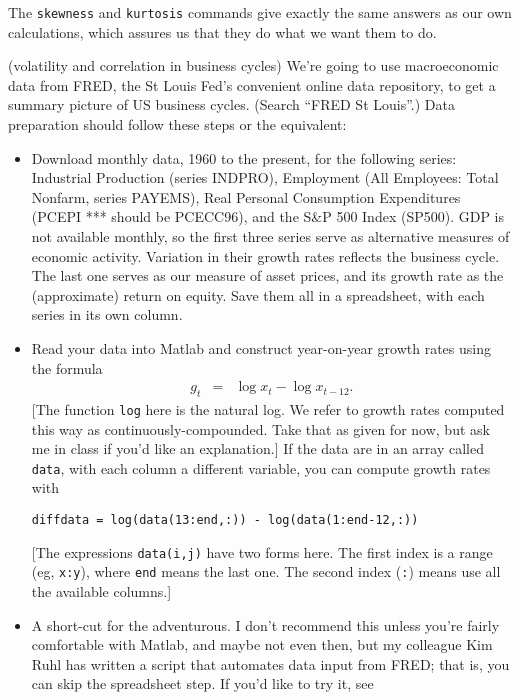 \documentclass[11pt]{exam}
\begin{document}
\begin{questions}
\begin{solution}
\begin{parts}
\item The {\tt skewness} and {\tt kurtosis} commands
give exactly the same answers as our own calculations,
which assures us that they do what we want them to do.
\end{parts}
\end{solution}

\question (volatility and correlation in business cycles)
We're going to use macroeconomic data from FRED,
the St Louis Fed's convenient online data repository,
to get a summary picture of US business cycles.
(Search ``FRED St Louis''.)
%
Data preparation should follow these steps or the equivalent:
\begin{itemize}
\item Download monthly data, 1960 to the present,
for the following series:
Industrial Production (series INDPRO),
Employment (All Employees: Total Nonfarm, series PAYEMS),
Real Personal Consumption Expenditures (PCEPI *** should be PCECC96),
and the S\&P 500 Index (SP500).
GDP is not available monthly, so the first three series serve as alternative
measures of economic activity.
Variation in their growth rates reflects the business cycle.
The last one serves as our measure of asset prices,
and its growth rate as the (approximate) return on equity.
Save them all in a spreadsheet, with each series in its own column.

\item Read your data into Matlab and construct year-on-year growth rates
using the formula
\begin{eqnarray*}
    g_{t} &=& \log x_t - \log x_{t-12} .
\end{eqnarray*}
[The function {\tt log} here is the natural log.
We refer to growth rates computed this way as continuously-compounded.
Take that as given for now,
but ask me in class if you'd like an explanation.]
If the data are in an array called {\tt data}, with each column a different variable,
you can compute growth rates with
\begin{verbatim}
diffdata = log(data(13:end,:)) - log(data(1:end-12,:))
\end{verbatim}
[The expressions {\tt data(i,j)} have two forms here.
The first index is a range (eg, {\tt x:y}), where
{\tt end} means the last one.
The second index ({\tt :}) means use all the available columns.]

\item A short-cut for the adventurous.
I don't recommend this
unless you're fairly comfortable with Matlab,
and maybe not even then,
but my colleague Kim Ruhl has written a script that automates
data input from FRED; that is, you can skip the spreadsheet step.
If you'd like to try it, see


\end{itemize}
\end{questions}
\end{document}
